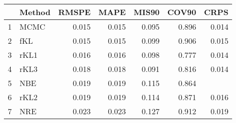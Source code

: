 \documentclass[12pt]{article}
\begin{document}
\thispagestyle{empty}
\begin{table}[ht]
\centering
\begin{tabular}{rlrrrrr}
  \hline
 & Method & RMSPE & MAPE & MIS90 & COV90 & CRPS \\ 
  \hline
1 & MCMC & 0.015 & 0.015 & 0.095 & 0.896 & 0.014 \\ 
  2 & fKL & 0.015 & 0.015 & 0.099 & 0.906 & 0.015 \\ 
  3 & rKL1 & 0.016 & 0.016 & 0.098 & 0.777 & 0.014 \\ 
  4 & rKL3 & 0.018 & 0.018 & 0.091 & 0.816 & 0.014 \\ 
  5 & NBE & 0.019 & 0.019 & 0.115 & 0.864 &  \\ 
  6 & rKL2 & 0.019 & 0.019 & 0.114 & 0.871 & 0.016 \\ 
  7 & NRE & 0.023 & 0.023 & 0.127 & 0.912 & 0.019 \\ 
   \hline
\end{tabular}
\end{table}
\end{document}
